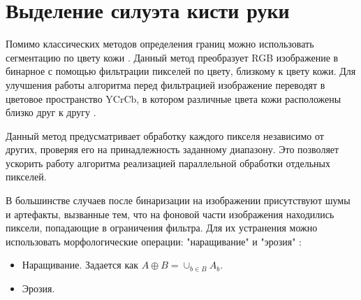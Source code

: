 \section{Выделение силуэта кисти руки}
\label{sec:Threholding}

Помимо классических методов определения границ можно использовать сегментацию по цвету кожи \cite{Phung}. Данный метод преобразует RGB изображение в бинарное с помощью фильтрации пикселей по цвету, близкому к цвету кожи. Для улучшения работы алгоритма перед фильтрацией изображение переводят в цветовое пространство YCrCb, в котором различные цвета кожи  расположены близко друг к другу \cite{Siddharth}.

Данный метод предусматривает обработку каждого пикселя независимо от других, проверяя его на принадлежность заданному диапазону. Это позволяет ускорить работу алгоритма реализацией параллельной обработки отдельных пикселей.

В большинстве случаев после бинаризации на изображении присутствуют шумы и артефакты, вызванные тем, что на фоновой части изображения находились пиксели, попадающие в ограничения фильтра. Для их устранения можно использовать морфологические операции: "наращивание" и "эрозия" \cite{DIP}:

\begin{itemize}
	\item Наращивание. Задается как $A \oplus B = \cup_{b \in B}A_b$. 
	\item Эрозия. 
\end{itemize}